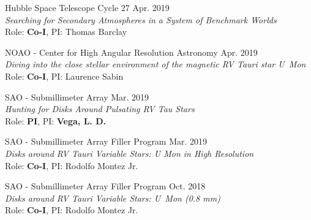 \documentclass[12pt]{article}
\begin{document}
\begin{etaremune}
\item Hubble Space Telescope Cycle 27 \hfill Apr. 2019 \\
\textit{Searching for Secondary Atmospheres in a System of Benchmark Worlds} \\ Role: \textbf{Co-I}, PI: Thomas Barclay

\item NOAO - Center for High Angular Resolution Astronomy \hfill Apr. 2019\\
\textit{Diving into the close stellar environment of the magnetic
RV Tauri star U~Mon} \\ Role: \textbf{Co-I}, PI: Laurence Sabin

\item SAO - Submillimeter Array \hfill Mar. 2019 \\
 \textit{Hunting for Disks Around Pulsating RV Tau Stars} \\ Role: \textbf{PI}, PI: \textbf{Vega, L. D.}

\item SAO - Submillimeter Array Filler Program \hfill Mar. 2019 \\
\textit{Disks around RV Tauri Variable Stars: U Mon in High Resolution} \\ Role: \textbf{Co-I}, PI: Rodolfo Montez Jr.

\item SAO - Submillimeter Array Filler Program \hfill Oct. 2018 \\
\textit{Disks around RV Tauri Variable Stars: U~Mon (0.8 mm)} \\ Role: \textbf{Co-I}, PI: Rodolfo Montez Jr.





\end{etaremune}
\end{document}
